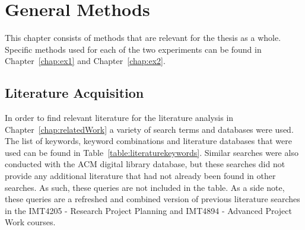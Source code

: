 \chapter{General Methods} \label{chap:generalmethods}
This chapter consists of methods that are relevant for the thesis as a whole. Specific methods used for each of the two experiments can be found in Chapter~\ref{chap:ex1} and Chapter~\ref{chap:ex2}. 

\section{Literature Acquisition}
In order to find relevant literature for the literature analysis in Chapter~\ref{chap:relatedWork} a variety of search terms and databases were used. The list of keywords, keyword combinations and literature databases that were used can be found in Table~\ref{table:literaturekeywords}. 
Similar searches were also conducted with the ACM digital library database, but these searches did not provide any additional literature that had not already been found in other searches. As such, these queries are not included in the table. As a side note, these queries are a refreshed and combined version of previous literature searches in the IMT4205 - Research Project Planning and IMT4894 - Advanced Project Work courses. 

